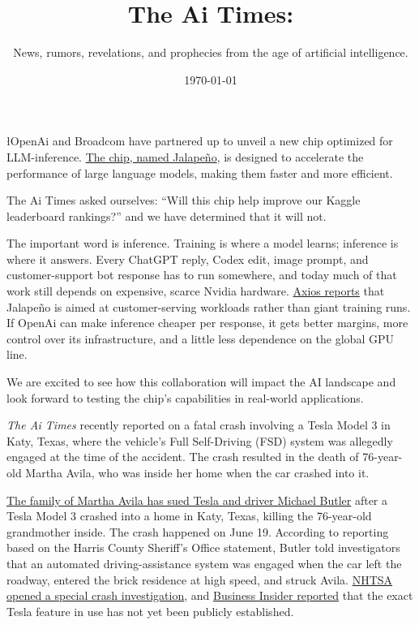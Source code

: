 \documentclass{news}
\title    {The Ai Times:}
\subtitle {News, rumors, revelations, and prophecies from the age of artificial intelligence.}
\date     {\today}
\begin{document}


{\l{O}penAi and Broadcom have partnered up to unveil a new chip optimized for LLM-inference. \href{https://www.theverge.com/ai-artificial-intelligence/955939/openai-reveals-its-first-ai-processor-jalapeno}{The chip, named Jalapeño}, is designed to accelerate the performance of large language models, making them faster and more efficient.
\par} 

The Ai Times asked ourselves: ``Will this chip help improve our Kaggle leaderboard rankings?'' and we have determined that it will not. 

The important word is inference. Training is where a model learns; inference is where it answers. Every ChatGPT reply, Codex edit, image prompt, and customer-support bot response has to run somewhere, and today much of that work still depends on expensive, scarce Nvidia hardware. \href{https://www.axios.com/2026/06/24/openai-jalapeno-ai-chip-broadcom-nvidia}{Axios reports} that Jalapeño is aimed at customer-serving workloads rather than giant training runs. If OpenAi can make inference cheaper per response, it gets better margins, more control over its infrastructure, and a little less dependence on the global GPU line.

We are excited to see how this collaboration will impact the AI landscape and look forward to testing the chip's capabilities in real-world applications. 


\emph{The Ai Times} recently reported on a fatal crash involving a Tesla Model 3 in Katy, Texas, where the vehicle's Full Self-Driving (FSD) system was allegedly engaged at the time of the accident. The crash resulted in the death of 76-year-old Martha Avila, who was inside her home when the car crashed into it.

\href{https://www.houstonchronicle.com/news/houston-texas/trending/article/tesla-elon-musk-fatal-crash-lawsuit-avila-22318747.php}{The family of Martha Avila has sued Tesla and driver Michael Butler} after a Tesla Model 3 crashed into a home in Katy, Texas, killing the 76-year-old grandmother inside. The crash happened on June 19. According to reporting based on the Harris County Sheriff's Office statement, Butler told investigators that an automated driving-assistance system was engaged when the car left the roadway, entered the brick residence at high speed, and struck Avila. \href{https://apnews.com/article/d0a9a3fbe237b6d7f9b6d33be618e946}{NHTSA opened a special crash investigation}, and \href{https://www.businessinsider.com/tesla-driver-automated-driving-assistance-system-texas-crash-kills-woman-2026-6}{Business Insider reported} that the exact Tesla feature in use has not yet been publicly established.
\end{document}
